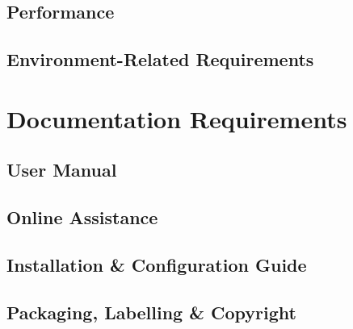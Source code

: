 \documentclass[12pt,a4paper,oneside, titlepage]{article}
\begin{document}
	\subsection{Performance}
	\subsection{Environment-Related Requirements}

    \newpage
	\section{Documentation Requirements}
	\subsection{User Manual}
	\subsection{Online Assistance}
	\subsection{Installation \& Configuration Guide}
	\subsection{Packaging, Labelling \& Copyright}
    \newpage
    {}
    
\end{document}
